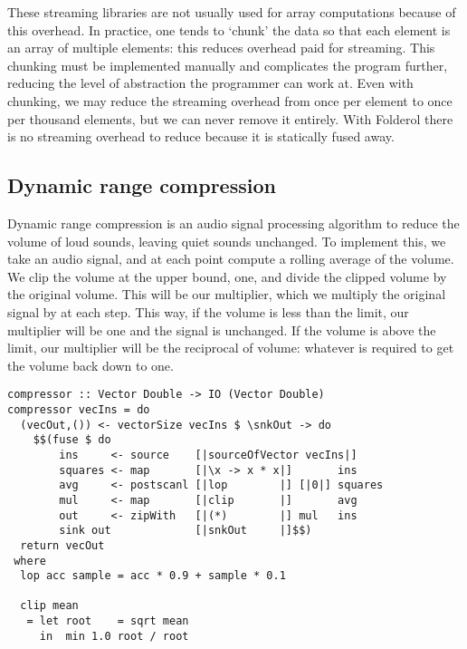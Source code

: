 
These streaming libraries are not usually used for array computations because of this overhead.
In practice, one tends to `chunk' the data so that each element is an array of multiple elements: this reduces overhead paid for streaming.
This chunking must be implemented manually and complicates the program further, reducing the level of abstraction the programmer can work at.
Even with chunking, we may reduce the streaming overhead from once per element to once per thousand elements, but we can never remove it entirely.
With Folderol there is no streaming overhead to reduce because it is statically fused away.

\subsection{Dynamic range compression}
Dynamic range compression is an audio signal processing algorithm to reduce the volume of loud sounds, leaving quiet sounds unchanged.
To implement this, we take an audio signal, and at each point compute a rolling average of the volume.
We clip the volume at the upper bound, one, and divide the clipped volume by the original volume.
This will be our multiplier, which we multiply the original signal by at each step.
This way, if the volume is less than the limit, our multiplier will be one and the signal is unchanged. 
If the volume is above the limit, our multiplier will be the reciprocal of volume: whatever is required to get the volume back down to one.

\begin{lstlisting}[float,label=l:bench:compressorFolderol,caption=Folderol implementation of compressor]
compressor :: Vector Double -> IO (Vector Double)
compressor vecIns = do
  (vecOut,()) <- vectorSize vecIns $ \snkOut -> do
    $$(fuse $ do
        ins     <- source    [|sourceOfVector vecIns|]
        squares <- map       [|\x -> x * x|]       ins
        avg     <- postscanl [|lop        |] [|0|] squares
        mul     <- map       [|clip       |]       avg
        out     <- zipWith   [|(*)        |] mul   ins
        sink out             [|snkOut     |]$$)
  return vecOut
 where
  lop acc sample = acc * 0.9 + sample * 0.1

  clip mean
   = let root    = sqrt mean
     in  min 1.0 root / root
\end{lstlisting}

